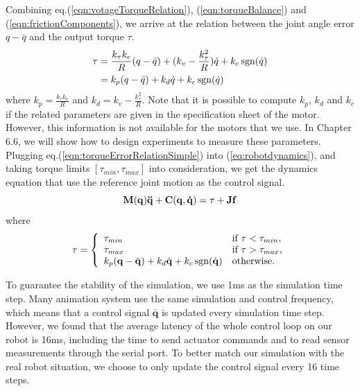 Combining eq.(\ref{eqn:votageTorqueRelation}), (\ref{eqn:torqueBalance}) and (\ref{eqn:frictionComponents}), we arrive at the relation between the joint angle error $q-\bar{q}$ and the output torque $\tau$.
\begin{align}
\nonumber  \tau & = \frac{k_{\tau}k_e}{R}(q-\bar{q})+(k_v-\frac{k_{\tau}^2}{R})\dot{q}+k_c\operatorname{sgn}(\dot{q})\\
\nonumber & = k_p(q-\bar{q}) + k_d\dot{q} + k_c\operatorname{sgn}(\dot{q})\\
  \label{eqn:torqueErrorRelationSimple}
\end{align}
where $k_p=\frac{k_{\tau}k_e}{R}$ and $k_d=k_v-\frac{k_{\tau}^2}{R}$. Note that it is possible to compute $k_p$, $k_d$ and $k_c$ if the related parameters are given in the specification sheet of the motor. However, this information is not available for the motors that we use. In Chapter 6.6, we will show how to design experiments to measure these parameters. Plugging eq.(\ref{eqn:torqueErrorRelationSimple}) into (\ref{eq:robotdynamics}), and taking torque limits $[\tau_{min}, \tau_{max}]$ into consideration, we get the dynamics equation that use the reference joint motion as the control signal.
\begin{displaymath}
 \mathbf{M}(\mathbf{q})\mathbf{\ddot{q}}+\mathbf{C}(\mathbf{q},\mathbf{\dot{q}}) = \tau+\mathbf{Jf} \\
  \end{displaymath}
where 
\begin{displaymath}\tau =
  \left\{
    \begin{array}{ll}
      \tau_{min} & \text{if }\tau < \tau_{min},\\
      \tau_{max} & \text{if }\tau > \tau_{max},\\
      k_p(\mathbf{q}-\bar{\mathbf{q}}) + k_d\dot{\mathbf{q}} + k_c\operatorname{sgn}(\dot{\mathbf{q}}) & \text{otherwise.}\\
    \end{array}
  \right.
  \label{eqn:robotDynamicsControl}
\end{displaymath}

To guarantee the stability of the simulation, we use 1ms as the simulation time step. Many animation system use the same simulation and control frequency, which means that a control signal $\bar{\mathbf{q}}$ is updated every simulation time step. However, we found that the average latency of the whole control loop on our robot is 16ms, including the time to send actuator commands and to read sensor measurements through the serial port. To better match our simulation with the real robot situation, we choose to only update the control signal every 16 time steps.

